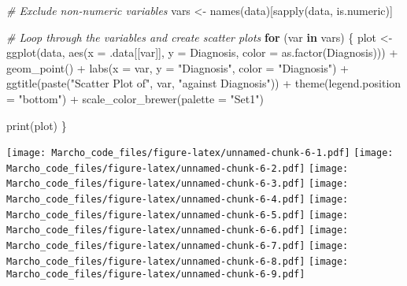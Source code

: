 \documentclass[
]{article}
\newenvironment{Shaded}{\begin{snugshade}}{\end{snugshade}}
\newcommand{\AttributeTok}[1]{\textcolor[rgb]{0.77,0.63,0.00}{#1}}
\newcommand{\CommentTok}[1]{\textcolor[rgb]{0.56,0.35,0.01}{\textit{#1}}}
\newcommand{\ControlFlowTok}[1]{\textcolor[rgb]{0.13,0.29,0.53}{\textbf{#1}}}
\newcommand{\FunctionTok}[1]{\textcolor[rgb]{0.00,0.00,0.00}{#1}}
\newcommand{\NormalTok}[1]{#1}
\newcommand{\OtherTok}[1]{\textcolor[rgb]{0.56,0.35,0.01}{#1}}
\newcommand{\SpecialCharTok}[1]{\textcolor[rgb]{0.00,0.00,0.00}{#1}}
\newcommand{\StringTok}[1]{\textcolor[rgb]{0.31,0.60,0.02}{#1}}
\begin{document}
\begin{Shaded}
\begin{Highlighting}[]
\CommentTok{\# Exclude non{-}numeric variables}
\NormalTok{vars }\OtherTok{\textless{}{-}} \FunctionTok{names}\NormalTok{(data)[}\FunctionTok{sapply}\NormalTok{(data, is.numeric)]}

\CommentTok{\# Loop through the variables and create scatter plots}
\ControlFlowTok{for}\NormalTok{ (var }\ControlFlowTok{in}\NormalTok{ vars) \{}
\NormalTok{  plot }\OtherTok{\textless{}{-}} \FunctionTok{ggplot}\NormalTok{(data, }\FunctionTok{aes}\NormalTok{(}\AttributeTok{x =}\NormalTok{ .data[[var]], }\AttributeTok{y =}\NormalTok{ Diagnosis, }\AttributeTok{color =} \FunctionTok{as.factor}\NormalTok{(Diagnosis))) }\SpecialCharTok{+}
    \FunctionTok{geom\_point}\NormalTok{() }\SpecialCharTok{+}
    \FunctionTok{labs}\NormalTok{(}\AttributeTok{x =}\NormalTok{ var, }\AttributeTok{y =} \StringTok{"Diagnosis"}\NormalTok{, }\AttributeTok{color =} \StringTok{"Diagnosis"}\NormalTok{) }\SpecialCharTok{+}
    \FunctionTok{ggtitle}\NormalTok{(}\FunctionTok{paste}\NormalTok{(}\StringTok{"Scatter Plot of"}\NormalTok{, var, }\StringTok{"against Diagnosis"}\NormalTok{)) }\SpecialCharTok{+}
    \FunctionTok{theme}\NormalTok{(}\AttributeTok{legend.position =} \StringTok{"bottom"}\NormalTok{) }\SpecialCharTok{+}
    \FunctionTok{scale\_color\_brewer}\NormalTok{(}\AttributeTok{palette =} \StringTok{"Set1"}\NormalTok{)}
  
  \FunctionTok{print}\NormalTok{(plot)}
\NormalTok{\}}
\end{Highlighting}
\end{Shaded}

\texttt{[image: Marcho\_code\_files/figure-latex/unnamed-chunk-6-1.pdf]}
\texttt{[image: Marcho\_code\_files/figure-latex/unnamed-chunk-6-2.pdf]}
\texttt{[image: Marcho\_code\_files/figure-latex/unnamed-chunk-6-3.pdf]}
\texttt{[image: Marcho\_code\_files/figure-latex/unnamed-chunk-6-4.pdf]}
\texttt{[image: Marcho\_code\_files/figure-latex/unnamed-chunk-6-5.pdf]}
\texttt{[image: Marcho\_code\_files/figure-latex/unnamed-chunk-6-6.pdf]}
\texttt{[image: Marcho\_code\_files/figure-latex/unnamed-chunk-6-7.pdf]}
\texttt{[image: Marcho\_code\_files/figure-latex/unnamed-chunk-6-8.pdf]}
\texttt{[image: Marcho\_code\_files/figure-latex/unnamed-chunk-6-9.pdf]}
\end{document}

